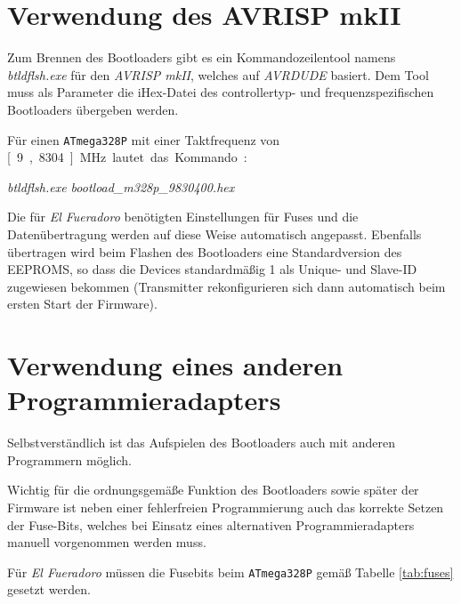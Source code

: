 \documentclass[pdftex, parskip, numbers=noenddot, toc=listof]{scrbook}
\newcommand{\anlage}{\emph{El Fueradoro}}
\begin{document}
		\section{Verwendung des AVRISP mkII}

			Zum Brennen des Bootloaders gibt es ein Kommandozeilentool namens \emph{btldflsh.exe} für den \emph{AVRISP mkII}, welches auf \emph{AVRDUDE} basiert. Dem Tool muss als Parameter die iHex-Datei des controllertyp- und frequenzspezifischen Bootloaders übergeben werden.

			Für einen \texttt{ATmega328P} mit einer Taktfrequenz von \unit[9{,}8304]{MHz} lautet das Kommando:

			\begin{center}
				\emph{btldflsh.exe bootload\_m328p\_9830400.hex}
			\end{center}

			Die für {\anlage} benötigten Einstellungen für Fuses und die Datenübertragung werden auf diese Weise automatisch angepasst. Ebenfalls übertragen wird beim Flashen des Bootloaders eine Standardversion des EEPROMS, so dass die Devices standardmäßig 1 als Unique- und Slave-ID zugewiesen bekommen (Transmitter rekonfigurieren sich dann automatisch beim ersten Start der Firmware).

		\section{Verwendung eines anderen Programmieradapters}

			Selbstverständlich ist das Aufspielen des Bootloaders auch mit anderen Programmern möglich.

			Wichtig für die ordnungsgemäße Funktion des Bootloaders sowie später der Firmware ist neben einer fehlerfreien Programmierung auch das korrekte Setzen der Fuse-Bits, welches bei Einsatz eines alternativen Programmieradapters manuell vorgenommen werden muss.

			Für {\anlage} müssen die Fusebits beim \texttt{ATmega328P} gemäß Tabelle \ref{tab:fuses} gesetzt werden.
\end{document}
